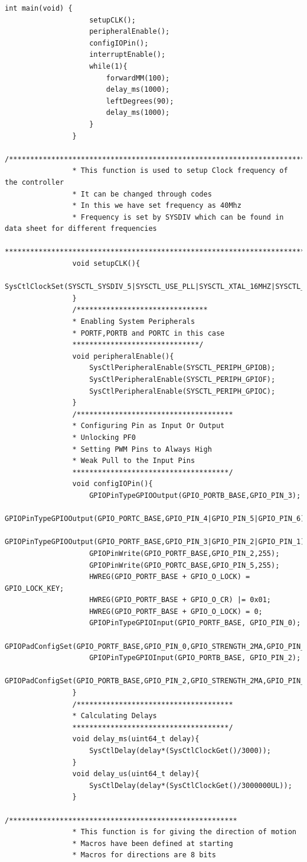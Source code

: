 \documentclass[a4paper,12pt,oneside]{article}
\begin{document}
\begin{lstlisting}[style=CStyle]
				int main(void) {
					setupCLK();
					peripheralEnable();
					configIOPin();
					interruptEnable();
					while(1){
						forwardMM(100);
						delay_ms(1000);
						leftDegrees(90);
						delay_ms(1000);
					}
				}
				/***************************************************************************************
				* This function is used to setup Clock frequency of the controller
				* It can be changed through codes
				* In this we have set frequency as 40Mhz
				* Frequency is set by SYSDIV which can be found in data sheet for different frequencies
				***************************************************************************************/
				void setupCLK(){
					SysCtlClockSet(SYSCTL_SYSDIV_5|SYSCTL_USE_PLL|SYSCTL_XTAL_16MHZ|SYSCTL_OSC_MAIN);
				}
				/*******************************
				* Enabling System Peripherals
				* PORTF,PORTB and PORTC in this case
				******************************/
				void peripheralEnable(){
					SysCtlPeripheralEnable(SYSCTL_PERIPH_GPIOB);
					SysCtlPeripheralEnable(SYSCTL_PERIPH_GPIOF);
					SysCtlPeripheralEnable(SYSCTL_PERIPH_GPIOC);
				}
				/*************************************
				* Configuring Pin as Input Or Output
				* Unlocking PF0
				* Setting PWM Pins to Always High
				* Weak Pull to the Input Pins
				*************************************/
				void configIOPin(){
					GPIOPinTypeGPIOOutput(GPIO_PORTB_BASE,GPIO_PIN_3);
					GPIOPinTypeGPIOOutput(GPIO_PORTC_BASE,GPIO_PIN_4|GPIO_PIN_5|GPIO_PIN_6);
					GPIOPinTypeGPIOOutput(GPIO_PORTF_BASE,GPIO_PIN_3|GPIO_PIN_2|GPIO_PIN_1);
					GPIOPinWrite(GPIO_PORTF_BASE,GPIO_PIN_2,255);
					GPIOPinWrite(GPIO_PORTC_BASE,GPIO_PIN_5,255);
					HWREG(GPIO_PORTF_BASE + GPIO_O_LOCK) = GPIO_LOCK_KEY;
					HWREG(GPIO_PORTF_BASE + GPIO_O_CR) |= 0x01;
					HWREG(GPIO_PORTF_BASE + GPIO_O_LOCK) = 0;
					GPIOPinTypeGPIOInput(GPIO_PORTF_BASE, GPIO_PIN_0);
					GPIOPadConfigSet(GPIO_PORTF_BASE,GPIO_PIN_0,GPIO_STRENGTH_2MA,GPIO_PIN_TYPE_STD_WPU);
					GPIOPinTypeGPIOInput(GPIO_PORTB_BASE, GPIO_PIN_2);
					GPIOPadConfigSet(GPIO_PORTB_BASE,GPIO_PIN_2,GPIO_STRENGTH_2MA,GPIO_PIN_TYPE_STD_WPU);
				}
				/*************************************
				* Calculating Delays
				*************************************/
				void delay_ms(uint64_t delay){
					SysCtlDelay(delay*(SysCtlClockGet()/3000));
				}
				void delay_us(uint64_t delay){
					SysCtlDelay(delay*(SysCtlClockGet()/3000000UL));
				}
				/******************************************************
				* This function is for giving the direction of motion
				* Macros have been defined at starting
				* Macros for directions are 8 bits

\end{lstlisting}
\end{document}
